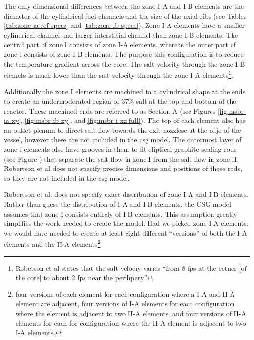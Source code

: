 The only dimensional differences between the zone I-A and I-B elements are the
diameter of the cylindrical fuel channels and the size of the axial ribs (see
Tables \ref{tab:zone-ia-ref-specs} and \ref{tab:zone-ib-specs}). Zone I-A
elements have a smaller cylindrical channel and larger interstitial channel
than zone I-B elements. The central part of zone I consists of zone I-A
elements, whereas the outer part of zone I consists of zone I-B
elements\cite{robertson_conceptual_1971}. The purpose this configuration is to
reduce the temperature gradient across the core. The salt velocity through the
zone I-B elemets is much lower than the salt velocity through the zone I-A
elements\footnote{Robetson et al states that the salt velociy varies ``from 8
fps at the cetner [of the core] to about 2 fps near the
perihpery''\cite{robertson_conceptual_1971}}.

Additionally the zone I elements are machined to a cylindrical shape at the ends
to create an undermoderated region of 37\% salt at the top and bottom of the
reactor\cite{robertson_conceptual_1971}. These machined ends are referred to as
Section A (see Figures \ref{fig:msbr-ia-xy}, \ref{fig:msbr-ib-xy}, and
\ref{fig:msbr-i-xz-full}). The top of each element also has an outlet plenum to
direct salt flow towards the exit nozzlese at the edje of the vessel, however
these are not included in the \Gls{csg} model. The outermost layer of zone I
elements also have grooves in them to fit eliptical graphite sealing rods (see
Figure \cite{fig:msbr-detail}) that separate the salt flow in zone I from the
salt flow in zone II\cite{robertson_conceptual_1971}. Robertson et al does not
specify precise dimensions and positions of these rods, so they are not included
in the \Gls{csg} model.

Robertson et al. does not specify exact distribution of zone I-A and I-B
elements. Rather than guess the distribution of I-A and I-B elements, the CSG
model assumes that zone I consists entirely of I-B elements. This assumption
greatly simplifies the work needed to create the model. Had we picked zone I-A
elements, we would have needed to create at least eight different ``versions''
of both the I-A elements and the II-A elements\footnote{four versions of each
element for each configuration where a I-A and II-A element are adjacent,
four versions of I-A elements for each configuration where the element is
adjacent to two II-A elements, and four versions of II-A elements for each for
configuration where the II-A element is adjacent to two I-A elements.}

